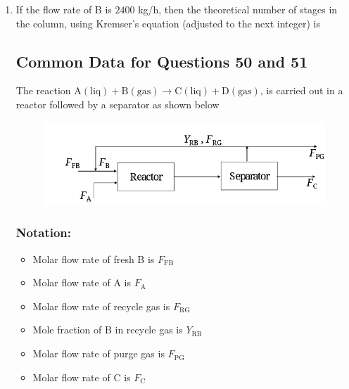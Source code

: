 \documentclass[journal,12pt,onecolumn]{IEEEtran}
\theoremstyle{remark}
\begin{document}
\begin{enumerate}
    \item If the flow rate of B is $2400$ kg/h, then the theoretical number of stages in the column, using Kremser's equation (adjusted to the next integer) is
    \begin{enumerate}
    \hfill{}
    \end{enumerate}

\subsection*{Common Data for Questions 50 and 51}
The reaction $\text{A}{(\text{liq})} + \text{B}{(\text{gas})} \rightarrow \text{C}{(\text{liq})} + \text{D}{(\text{gas})}$, is carried out in a reactor followed by a separator as shown below
\hfill{}
\begin{figure}[H]
    \centering
\includegraphics[width=0.5\columnwidth]{figs/qn 50 .jpg}
    \caption{}
\label{fig:qn51.jpg}
\end{figure}

\subsubsection*{Notation:}
\begin{itemize}
    \item Molar flow rate of fresh B is $F_{\text{FB}}$
    \item Molar flow rate of A is $F_{\text{A}}$
    \item Molar flow rate of recycle gas is $F_{\text{RG}}$
    \item Mole fraction of B in recycle gas is $Y_{\text{RB}}$
    \item Molar flow rate of purge gas is $F_{\text{PG}}$
    \item Molar flow rate of C is $F_{\text{C}}$
\end{itemize}


\end{enumerate}
\end{document}
